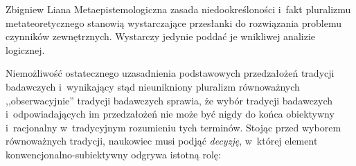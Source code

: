 \begin{artplenv}{Zbigniew Liana}
Metaepistemologiczna zasada niedookreśloności i~fakt pluralizmu metateoretycznego stanowią wystarczające przesłanki do rozwiązania problemu czynników zewnętrznych. Wystarczy jedynie poddać je wnikliwej analizie logicznej.

Niemożliwość ostatecznego uzasadnienia podstawowych przedzałożeń tradycji badawczych i~wynikający stąd nieunikniony pluralizm równoważnych ,,obserwacyjnie'' tradycji badawczych sprawia, że wybór tradycji badawczych i~odpowiadających im przedzałożeń nie może być nigdy do końca obiektywny i~racjonalny w~tradycyjnym rozumieniu tych terminów. Stojąc przed wyborem równoważnych tradycji, naukowiec musi podjąć \textit{decyzję}, w~której element konwencjonalno-subiektywny odgrywa istotną rolę:



\end{artplenv}
